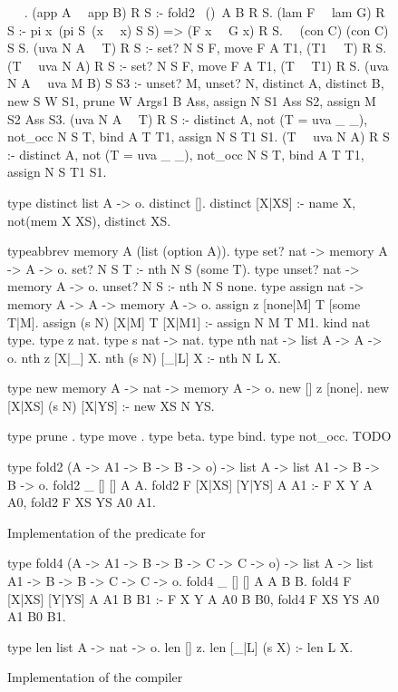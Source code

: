 \begin{figure*}
\begin{elpicode}
~  ~.
(app A ~\Ue~app B) R S :- fold2 ~(\Ue)~A B R S.
(lam F ~\Ue~lam G) R S :- pi x\ (pi S\ (x ~\Ue~x) S S) => (F x ~\Ue~G x) R S.
~\Ue~(con C) (con C) S S.
(uva N A ~\Ue~T) R S :- set? N S F, move F A T1, (T1 ~\Ue~T) R S.
(T ~\Ue~uva N A) R S :- set? N S F, move F A T1, (T ~\Ue~T1) R S.
(uva N A ~\Ue~uva M B) S S3 :-  unset? M, unset? N,
  distinct A, distinct B, 
  new S W S1, prune W Args1 B Ass, 
  assign N S1 Ass S2, assign M S2 Ass S3.
(uva N A ~\Ue~T) R S :- distinct A, not (T = uva _ _), not_occ N S T,  
  bind A T T1, assign N S T1 S1.
(T ~\Ue~uva N A) R S :- distinct A, not (T = uva _ _), not_occ N S T, 
  bind A T T1, assign N S T1 S1. 
      
type distinct list A -> o.
distinct [].
distinct [X|XS] :- name X, not(mem X XS),
distinct XS.

typeabbrev memory A (list (option A)).
type set? nat -> memory A -> A -> o.
set? N S T :- nth N S (some T).
type unset? nat -> memory A -> o.
unset? N S :- nth N S none.
type assign nat -> memory A -> A -> memory A -> o.
assign z [none|M] T [some T|M].
assign (s N) [X|M] T [X|M1] :- assign N M T M1. 
kind nat type.
type z nat.
type s nat -> nat.
type nth nat -> list A -> A -> o.
nth z [X|_] X.
nth (s N) [_|L] X :- nth N L X.

type new memory A -> nat -> memory A -> o.
new [] z [none].
new [X|XS] (s N) [X|YS] :- new XS N YS.

type prune .
type move .
type beta.
type bind.
type not_occ.
TODO

type fold2 (A -> A1 -> B -> B -> o) -> list A -> list A1 -> B -> B -> o.
fold2 _ [] [] A A.
fold2 F [X|XS] [Y|YS] A A1 :- F X Y A A0, fold2 F XS YS A0 A1.

\end{elpicode}
\caption{Implementation of the \Ue predicate for \Ho}
\label{code:ue-pred}
\end{figure*}

\begin{figure*}
\begin{elpicode}
type fold4 (A -> A1 -> B -> B -> C -> C -> o) -> list A -> list A1 -> B -> B -> C -> C -> o.
fold4 _ [] [] A A B B.
fold4 F [X|XS] [Y|YS] A A1 B B1 :- F X Y A A0 B B0, fold4 F XS YS A0 A1 B0 B1.

type len list A -> nat -> o.
len [] z.
len [_|L] (s X) :- len L X.

\end{elpicode}
\caption{Implementation of the compiler}
\label{code:ue-pred}
\end{figure*}
